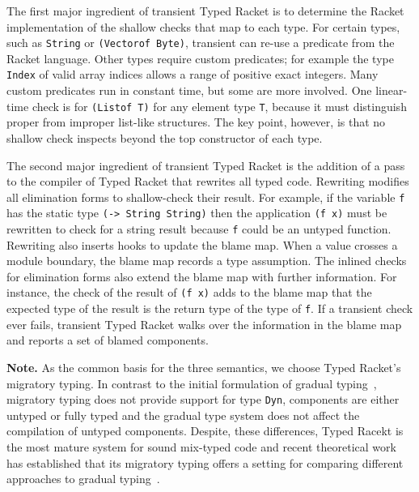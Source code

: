 The first major ingredient of transient Typed Racket is to determine the
Racket implementation of the shallow checks that map to each type.  For
certain types, such as {\tt String} or {\tt (Vectorof Byte)}, transient
can re-use a predicate from the Racket language.  Other types require custom
predicates; for example the type {\tt Index} of valid array indices allows
a range of positive exact integers.  Many custom predicates run in
constant time, but some are more involved.  One linear-time check is for
{\tt (Listof T)} for any element type {\tt T}, because it must distinguish
proper from improper list-like structures.  The
key point, however, is that no shallow check inspects beyond the top
constructor of each type.

The second major ingredient of transient Typed Racket  is the addition of
a pass to the compiler of Typed Racket that rewrites all typed code.
Rewriting modifies all elimination forms to shallow-check their result.
For example, if the variable {\tt f} has the static type {\tt (-> String
String)} then the application {\tt (f x)} must be rewritten to check for a
string result because {\tt f} could be an untyped function.  Rewriting
also inserts hooks to update the blame map.  When a value crosses a module
boundary, the blame map records a type assumption.  The inlined checks
for elimination forms also extend the blame map with further information. For
instance, the check of the result of {\tt (f x)} adds to the blame map
that the expected type of the result is the return type of the type of
{\tt f}.  If a transient check ever fails, transient Typed Racket walks over 
the information in the blame map and reports a set of blamed components.

\smallskip
\noindent
{\bf Note.} As the common basis for the three semantics, we choose 
Typed Racket's migratory typing. In contrast to the initial formulation of
gradual typing~\cite{st-sfp-2006}, migratory typing does not provide
support for type \texttt{Dyn}, components are either untyped or fully
typed and the gradual type system does not affect the compilation of
untyped components. Despite, these differences, Typed Racekt is the most
mature system for sound mix-typed code
and recent theoretical work has established that
its migratory typing offers a setting for comparing different approaches to gradual
typing~\cite{gf-icfp-2018,gfd-oopsla-2019}.
